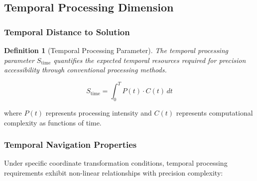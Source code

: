 \documentclass[12pt,a4paper]{article}
\newtheorem{definition}[theorem]{Definition}
\begin{document}
{{{{{{{{{{{{{\subsection{Temporal Processing Dimension}

\subsubsection{Temporal Distance to Solution}

\begin{definition}[Temporal Processing Parameter]
The temporal processing parameter $S_{\text{time}}$ quantifies the expected temporal resources required for precision accessibility through conventional processing methods.
\end{definition}

\begin{equation}
S_{\text{time}} = \int_0^T P(t) \cdot C(t) \, dt
\label{eq:temporal_processing}
\end{equation}

where $P(t)$ represents processing intensity and $C(t)$ represents computational complexity as functions of time.

\subsubsection{Temporal Navigation Properties}

Under specific coordinate transformation conditions, temporal processing requirements exhibit non-linear relationships with precision complexity:

\begin{figure}[H]
\centering
{}
\end{figure}}}}}}}}}}}}}}
\end{document}
